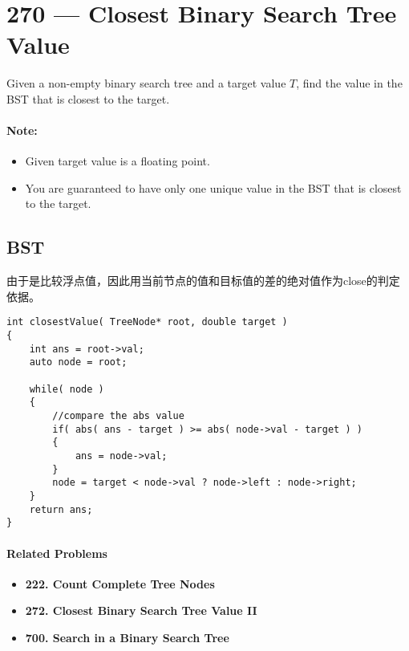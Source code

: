 \section{270 --- Closest Binary Search Tree Value}
Given a non-empty binary search tree and a target value $T$, find the value in the BST that is closest to the target.

\paragraph{Note:}

\begin{itemize}
\item Given target value is a floating point.
\item You are guaranteed to have only one unique value in the BST that is closest to the target.
\end{itemize}
\subsection{BST}
由于是比较浮点值，因此用当前节点的值和目标值的差的绝对值作为close的判定依据。
\setcounter{lstlisting}{0}
\begin{lstlisting}[style=customc,caption={BST}]
int closestValue( TreeNode* root, double target )
{
    int ans = root->val;
    auto node = root;

    while( node )
    {
        //compare the abs value
        if( abs( ans - target ) >= abs( node->val - target ) )
        {
            ans = node->val;
        }
        node = target < node->val ? node->left : node->right;
    }
    return ans;
}
\end{lstlisting}

\paragraph{Related Problems}
\begin{itemize}
\item \textbf{222. Count Complete Tree Nodes}
\item \textbf{272. Closest Binary Search Tree Value II}
\item \textbf{700. Search in a Binary Search Tree}
\end{itemize}